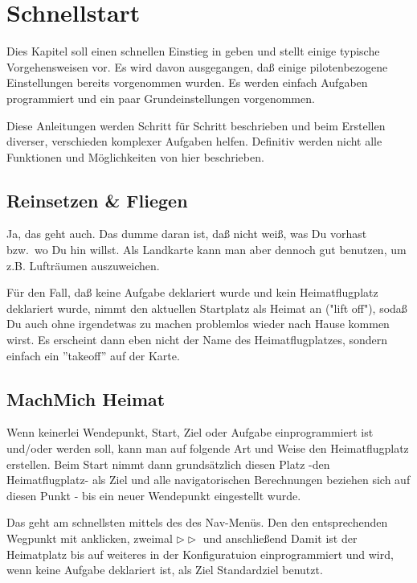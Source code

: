 \chapter{Schnellstart}\label{cha:quickstart}

Dies Kapitel soll einen schnellen Einstieg in \xc geben und stellt einige typische Vorgehensweisen vor.
Es wird davon ausgegangen, daß einige pilotenbezogene Einstellungen bereits vorgenommen wurden.
Es werden einfach Aufgaben programmiert und ein paar Grundeinstellungen vorgenommen.

Diese Anleitungen werden Schritt für Schritt beschrieben und beim Erstellen diverser, verschieden komplexer
Aufgaben helfen. Definitiv  werden nicht alle Funktionen und Möglichkeiten von \xc hier beschrieben.

\section{Reinsetzen \& Fliegen}
Ja, das geht auch. Das dumme daran ist, daß \xc nicht weiß, was Du vorhast bzw.\ wo Du hin willst.
Als Landkarte kann man \xc aber dennoch gut benutzen, um z.B. Lufträumen auszuweichen.

Für den Fall, daß keine Aufgabe deklariert wurde und kein Heimatflugplatz deklariert wurde, nimmt \xc den aktuellen Startplatz als Heimat an ("lift off"),
sodaß Du auch ohne irgendetwas zu machen problemlos wieder nach Hause kommen wirst.
Es erscheint dann eben nicht der Name des Heimatflugplatzes, sondern einfach ein ''takeoff'' auf der Karte.

\section{MachMich Heimat}
Wenn keinerlei Wendepunkt, Start, Ziel oder Aufgabe einprogrammiert ist und/oder werden soll, kann man auf
folgende Art und Weise den Heimatflugplatz erstellen.
Beim Start nimmt  \xc dann grundsätzlich diesen Platz -den Heimatflugplatz- als Ziel und alle
navigatorischen Berechnungen beziehen sich auf diesen Punkt - bis ein neuer Wendepunkt eingestellt wurde.

Das geht am schnellsten mittels des  des Nav-Menüs.  Den den entsprechenden Wegpunkt mit  anklicken,
zweimal  $\triangleright\triangleright$ und anschließend  
Damit ist der Heimatplatz bis auf weiteres in der Konfiguratuion einprogrammiert und wird, wenn keine Aufgabe deklariert ist, als Ziel
Standardziel benutzt.

